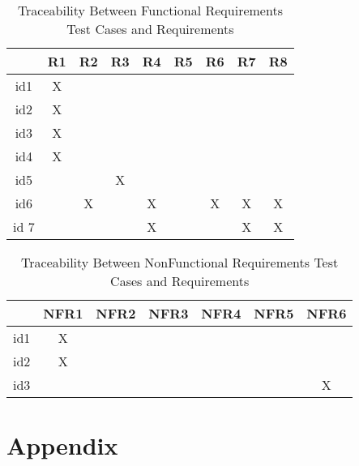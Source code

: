 \documentclass[12pt, titlepage]{article}
\begin{document}
\begin{table}[h!]
\centering
\begin{tabular}{|c|c|c|c|c|c|c|c|c|}
\hline        
	& R1& R2 & R3 &R4 & R5 &R6  &R7 &R8 \\
\hline
id1        & X &    &     &    &    &    &   &     \\ \hline
id2        & X &    &     &    &    &    &   &     \\ \hline
id3        & X &    &     &    &    &    &   &     \\ \hline
id4        & X &    &     &    &    &    &   &     \\ \hline
id5        &    &    & X  &    &    &    &   &     \\  \hline
id6      &    & X &     & X &    & X & X & X   \\ \hline
id 7      &    &    &     & X &    &    & X & X  \\ \hline


\hline
\end{tabular}
\caption{Traceability Between Functional Requirements Test Cases and
Requirements}
\label{Table:trace}
\end{table}

\begin{table}[h!]
\centering
\begin{tabular}{|c|c|c|c|c|c|c|}
\hline        
	& NFR1& NFR2 & NFR3 &NFR4 & NFR5 &NFR6 \\
\hline
id1        & X &    &     &    &    &     \\ \hline
id2        & X &    &     &    &    &     \\ \hline
id3        &    &    &     &    &    & X  \\ \hline


\hline
\end{tabular}
\caption{Traceability Between NonFunctional Requirements Test Cases and
Requirements}
\label{Table:trace}
\end{table}




\newpage


 
%


\newpage

\section{Appendix}
\end{document}
